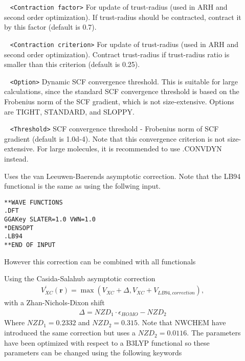 \begin{description}
\item[] \verb| | \newline
\verb|<Contraction factor>|\newline 
For update of trust-radius (used in ARH and second order optimization). If trust-radius
should be contracted,
contract it by this factor (default is 0.7).
\item[] \verb| | \newline
\verb|<Contraction criterion>|\newline 
For update of trust-radius (used in ARH and second order optimization). Contract trust-radius
if trust-radius ratio is smaller than this criterion (default is 0.25).
\item[] \verb| | \newline
\verb|<Option>|\newline 
Dynamic SCF convergence threshold. This is suitable for large calculations, since the standard SCF
convergence threshold is based on the Frobenius norm of the SCF gradient, which is not size-extensive.
Options are TIGHT, STANDARD, and SLOPPY.
\item[] \verb| | \newline
\verb|<Threshold>|\newline
SCF convergence threshold - Frobenius norm of SCF gradient (default is 1.0d-4). 
Note that this convergence criterion
is not size-extensive. For large molecules, it is recommended to use .CONVDYN instead.
\item[] Uses the van Leeuwen-Baerends asymptotic correction. Note that the LB94 functional is the same as using the follwing input. 
\begin{verbatim}
**WAVE FUNCTIONS
.DFT
GGAKey SLATER=1.0 VWN=1.0
*DENSOPT
.LB94
**END OF INPUT
\end{verbatim}
However this correction can be combined with all functionals
\item[] Using the Casida-Salahub asymptotic correction\cite{CasidaSalahub} 
\begin{eqnarray}
V^{\prime}_{XC}(\textbf{r}) = \max \left(V_{XC} + \Delta , V_{XC} + V_{LB94,correction}\right),  
\end{eqnarray}
with a Zhan-Nichols-Dixon shift \cite{dixon,ZND}
\begin{eqnarray}
\Delta = NZD_{1} \cdot \epsilon_{HOMO} - NZD_{2}
\end{eqnarray}
Where $NZD_{1} = 0.2332$ and $NZD_{2} = 0.315$. Note that NWCHEM have introduced the same correction but uses a $NZD_{2} = 0.0116$. The parameters have been optimized with respect to a B3LYP functional so these parameters can be changed using the following keywords

\end{description}
